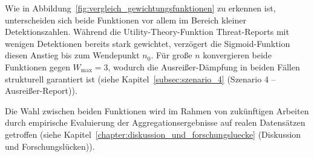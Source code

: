Wie in Abbildung~\ref{fig:vergleich_gewichtungsfunktionen} zu erkennen ist, unterscheiden sich beide Funktionen vor allem im Bereich kleiner Detektionszahlen. Während die Utility-Theory-Funktion Threat-Reports mit wenigen Detektionen bereits stark gewichtet, verzögert die Sigmoid-Funktion diesen Anstieg bis zum Wendepunkt $n_0$. Für große $n$ konvergieren beide Funktionen gegen $W_{\text{max}} = 3$, wodurch die Ausreißer-Dämpfung in beiden Fällen strukturell garantiert ist (siehe Kapitel~\ref{subsec:szenario_4} (Szenario 4 – Ausreißer-Report)).

Die Wahl zwischen beiden Funktionen wird im Rahmen von zukünftigen Arbeiten durch empirische Evaluierung der Aggregationsergebnisse auf realen Datensätzen getroffen (siehe Kapitel~\ref{chapter:diskussion_und_forschungsluecke} (Diskussion und Forschungslücken)).